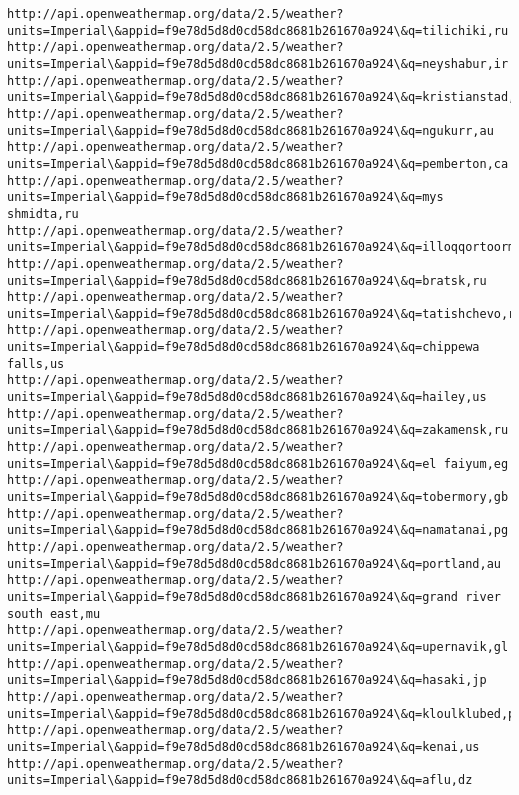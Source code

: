 \documentclass[11pt]{article}
\begin{document}
\begin{Verbatim}[commandchars=\\\{\}]
http://api.openweathermap.org/data/2.5/weather?units=Imperial\&appid=f9e78d5d8d0cd58dc8681b261670a924\&q=tilichiki,ru
http://api.openweathermap.org/data/2.5/weather?units=Imperial\&appid=f9e78d5d8d0cd58dc8681b261670a924\&q=neyshabur,ir
http://api.openweathermap.org/data/2.5/weather?units=Imperial\&appid=f9e78d5d8d0cd58dc8681b261670a924\&q=kristianstad,se
http://api.openweathermap.org/data/2.5/weather?units=Imperial\&appid=f9e78d5d8d0cd58dc8681b261670a924\&q=ngukurr,au
http://api.openweathermap.org/data/2.5/weather?units=Imperial\&appid=f9e78d5d8d0cd58dc8681b261670a924\&q=pemberton,ca
http://api.openweathermap.org/data/2.5/weather?units=Imperial\&appid=f9e78d5d8d0cd58dc8681b261670a924\&q=mys shmidta,ru
http://api.openweathermap.org/data/2.5/weather?units=Imperial\&appid=f9e78d5d8d0cd58dc8681b261670a924\&q=illoqqortoormiut,gl
http://api.openweathermap.org/data/2.5/weather?units=Imperial\&appid=f9e78d5d8d0cd58dc8681b261670a924\&q=bratsk,ru
http://api.openweathermap.org/data/2.5/weather?units=Imperial\&appid=f9e78d5d8d0cd58dc8681b261670a924\&q=tatishchevo,ru
http://api.openweathermap.org/data/2.5/weather?units=Imperial\&appid=f9e78d5d8d0cd58dc8681b261670a924\&q=chippewa falls,us
http://api.openweathermap.org/data/2.5/weather?units=Imperial\&appid=f9e78d5d8d0cd58dc8681b261670a924\&q=hailey,us
http://api.openweathermap.org/data/2.5/weather?units=Imperial\&appid=f9e78d5d8d0cd58dc8681b261670a924\&q=zakamensk,ru
http://api.openweathermap.org/data/2.5/weather?units=Imperial\&appid=f9e78d5d8d0cd58dc8681b261670a924\&q=el faiyum,eg
http://api.openweathermap.org/data/2.5/weather?units=Imperial\&appid=f9e78d5d8d0cd58dc8681b261670a924\&q=tobermory,gb
http://api.openweathermap.org/data/2.5/weather?units=Imperial\&appid=f9e78d5d8d0cd58dc8681b261670a924\&q=namatanai,pg
http://api.openweathermap.org/data/2.5/weather?units=Imperial\&appid=f9e78d5d8d0cd58dc8681b261670a924\&q=portland,au
http://api.openweathermap.org/data/2.5/weather?units=Imperial\&appid=f9e78d5d8d0cd58dc8681b261670a924\&q=grand river south east,mu
http://api.openweathermap.org/data/2.5/weather?units=Imperial\&appid=f9e78d5d8d0cd58dc8681b261670a924\&q=upernavik,gl
http://api.openweathermap.org/data/2.5/weather?units=Imperial\&appid=f9e78d5d8d0cd58dc8681b261670a924\&q=hasaki,jp
http://api.openweathermap.org/data/2.5/weather?units=Imperial\&appid=f9e78d5d8d0cd58dc8681b261670a924\&q=kloulklubed,pw
http://api.openweathermap.org/data/2.5/weather?units=Imperial\&appid=f9e78d5d8d0cd58dc8681b261670a924\&q=kenai,us
http://api.openweathermap.org/data/2.5/weather?units=Imperial\&appid=f9e78d5d8d0cd58dc8681b261670a924\&q=aflu,dz

\end{Verbatim}
\end{document}
